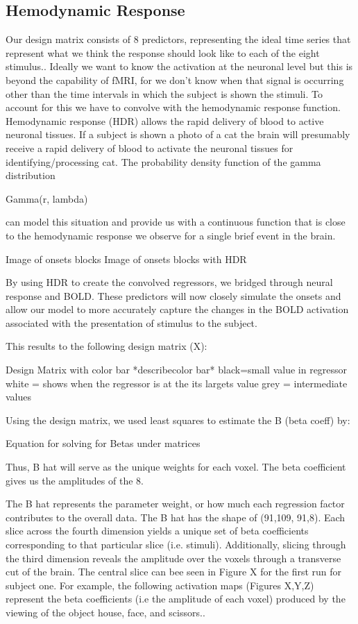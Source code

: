\documentclass[11pt]{article}
\begin{document}
\subsection{Hemodynamic Response}

Our design matrix consists of 8 predictors, representing the ideal time series 
that represent what we think the response should look like to each of the eight 
stimulus.. Ideally we want to know the activation at the neuronal level but 
this is beyond the capability of fMRI, for we don’t know when that signal 
is occurring other than the time intervals in which the subject is shown the 
stimuli. To account for this we have to convolve with the hemodynamic response 
function. Hemodynamic response (HDR) allows the rapid delivery of blood to 
active neuronal tissues. If a subject is shown a photo of a cat the brain will 
presumably receive a rapid delivery of blood to activate the neuronal tissues 
for identifying/processing cat. The probability density function of the gamma 
distribution
	
	         Gamma(r, lambda)

can model this situation and provide us with a continuous function that is 
close to the hemodynamic response we observe for a single brief event in the 
brain.

		Image of onsets blocks
		Image of onsets blocks with HDR

By using HDR to create the convolved regressors, we bridged through neural 
response and BOLD. These predictors will now closely simulate the onsets and 
allow our model to more accurately capture the changes in the BOLD activation 
associated with the presentation of stimulus to the subject.

This results to the following design matrix (X):

     Design Matrix with color bar  *describecolor bar*
     black=small value in regressor
     white = shows when the regressor is at the its largets value
     grey = intermediate values

Using the design matrix, we used least squares to estimate the B (beta coeff) by:

     Equation for solving for Betas under matrices

Thus, B hat will serve as the unique weights for each voxel. The beta 
coefficient gives us the amplitudes of the 8.

The B hat represents the parameter weight, or how much each regression factor 
contributes to the overall data. The B hat has the shape of (91,109, 91,8). 
Each slice across the fourth dimension yields a unique set of beta coefficients 
corresponding to that particular slice (i.e. stimuli). Additionally, slicing 
through the third dimension reveals the amplitude over the voxels through a 
transverse cut of the brain. The central slice can bee seen in Figure X for the 
first run for subject one.
For example, the following activation maps (Figures X,Y,Z) represent the beta 
coefficients (i.e the amplitude of each voxel) produced by the viewing of the 
object house, face, and scissors..
\end{document}
